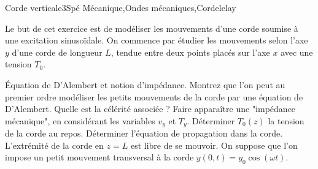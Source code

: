 
\begin{exercise}{Corde verticale}{3}{Spé}
{Mécanique,Ondes mécaniques,Corde}{lelay}

Le but de cet exercice est de modéliser les mouvements d'une corde soumise à une excitation sinusoïdale. On commence par étudier les mouvements selon l'axe $y$ d'une corde de longueur $L$, tendue entre deux points placés sur l'axe $x$ avec une tension $T_0$. 
\begin{questions}
    \questioncours Équation de D'Alembert et notion d'impédance.
    \question Montrez que l'on peut au premier ordre modéliser les petits mouvements de la corde par une équation de D'Alembert. Quelle est la célérité associée ?
    \question Faire apparaître une "impédance mécanique", en considérant les variables $v_y$ et $T_y$.
    \question Déterminer $T_0(z)$ la tension de la corde au repos.
    \question Déterminer l'équation de propagation dans la corde.
    \question L'extrémité de la corde en $z=L$ est libre de se mouvoir. On suppose que l'on impose un petit mouvement transversal à la corde $y(0,t) = y_0\cos(\omega t)$.
\end{questions}
\end{exercise}